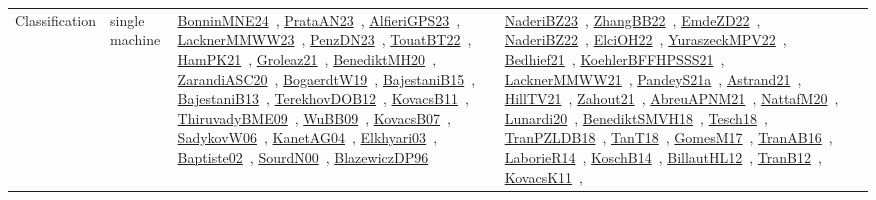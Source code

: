 {\begin{longtable}{lp{3cm}>{\raggedright\arraybackslash}p{6cm}>{\raggedright\arraybackslash}p{6cm}>{\raggedright\arraybackslash}p{8cm}}
Classification & single machine & \href{../works/BonninMNE24.pdf}{BonninMNE24}~\cite{BonninMNE24}, \href{../works/PrataAN23.pdf}{PrataAN23}~\cite{PrataAN23}, \href{../works/AlfieriGPS23.pdf}{AlfieriGPS23}~\cite{AlfieriGPS23}, \href{../works/LacknerMMWW23.pdf}{LacknerMMWW23}~\cite{LacknerMMWW23}, \href{../works/PenzDN23.pdf}{PenzDN23}~\cite{PenzDN23}, \href{../works/TouatBT22.pdf}{TouatBT22}~\cite{TouatBT22}, \href{../works/HamPK21.pdf}{HamPK21}~\cite{HamPK21}, \href{../works/Groleaz21.pdf}{Groleaz21}~\cite{Groleaz21}, \href{../works/BenediktMH20.pdf}{BenediktMH20}~\cite{BenediktMH20}, \href{../works/ZarandiASC20.pdf}{ZarandiASC20}~\cite{ZarandiASC20}, \href{../works/BogaerdtW19.pdf}{BogaerdtW19}~\cite{BogaerdtW19}, \href{../works/BajestaniB15.pdf}{BajestaniB15}~\cite{BajestaniB15}, \href{../works/BajestaniB13.pdf}{BajestaniB13}~\cite{BajestaniB13}, \href{../works/TerekhovDOB12.pdf}{TerekhovDOB12}~\cite{TerekhovDOB12}, \href{../works/KovacsB11.pdf}{KovacsB11}~\cite{KovacsB11}, \href{../works/ThiruvadyBME09.pdf}{ThiruvadyBME09}~\cite{ThiruvadyBME09}, \href{../works/WuBB09.pdf}{WuBB09}~\cite{WuBB09}, \href{../works/KovacsB07.pdf}{KovacsB07}~\cite{KovacsB07}, \href{../works/SadykovW06.pdf}{SadykovW06}~\cite{SadykovW06}, \href{../works/KanetAG04.pdf}{KanetAG04}~\cite{KanetAG04}, \href{../works/Elkhyari03.pdf}{Elkhyari03}~\cite{Elkhyari03}, \href{../works/Baptiste02.pdf}{Baptiste02}~\cite{Baptiste02}, \href{../works/SourdN00.pdf}{SourdN00}~\cite{SourdN00}, \href{../works/BlazewiczDP96.pdf}{BlazewiczDP96}~\cite{BlazewiczDP96} & \href{../works/NaderiBZ23.pdf}{NaderiBZ23}~\cite{NaderiBZ23}, \href{../works/ZhangBB22.pdf}{ZhangBB22}~\cite{ZhangBB22}, \href{../works/EmdeZD22.pdf}{EmdeZD22}~\cite{EmdeZD22}, \href{../works/NaderiBZ22.pdf}{NaderiBZ22}~\cite{NaderiBZ22}, \href{../works/ElciOH22.pdf}{ElciOH22}~\cite{ElciOH22}, \href{../works/YuraszeckMPV22.pdf}{YuraszeckMPV22}~\cite{YuraszeckMPV22}, \href{../works/Bedhief21.pdf}{Bedhief21}~\cite{Bedhief21}, \href{../works/KoehlerBFFHPSSS21.pdf}{KoehlerBFFHPSSS21}~\cite{KoehlerBFFHPSSS21}, \href{../works/LacknerMMWW21.pdf}{LacknerMMWW21}~\cite{LacknerMMWW21}, \href{../works/PandeyS21a.pdf}{PandeyS21a}~\cite{PandeyS21a}, \href{../works/Astrand21.pdf}{Astrand21}~\cite{Astrand21}, \href{../works/HillTV21.pdf}{HillTV21}~\cite{HillTV21}, \href{../works/Zahout21.pdf}{Zahout21}~\cite{Zahout21}, \href{../works/AbreuAPNM21.pdf}{AbreuAPNM21}~\cite{AbreuAPNM21}, \href{../works/NattafM20.pdf}{NattafM20}~\cite{NattafM20}, \href{../works/Lunardi20.pdf}{Lunardi20}~\cite{Lunardi20}, \href{../works/BenediktSMVH18.pdf}{BenediktSMVH18}~\cite{BenediktSMVH18}, \href{../works/Tesch18.pdf}{Tesch18}~\cite{Tesch18}, \href{../works/TranPZLDB18.pdf}{TranPZLDB18}~\cite{TranPZLDB18}, \href{../works/TanT18.pdf}{TanT18}~\cite{TanT18}, \href{../works/GomesM17.pdf}{GomesM17}~\cite{GomesM17}, \href{../works/TranAB16.pdf}{TranAB16}~\cite{TranAB16}, \href{../works/LaborieR14.pdf}{LaborieR14}~\cite{LaborieR14}, \href{../works/KoschB14.pdf}{KoschB14}~\cite{KoschB14}, \href{../works/BillautHL12.pdf}{BillautHL12}~\cite{BillautHL12}, \href{../works/TranB12.pdf}{TranB12}~\cite{TranB12}, \href{../works/KovacsK11.pdf}{KovacsK11}~\cite{KovacsK11}, 
\end{longtable}}
